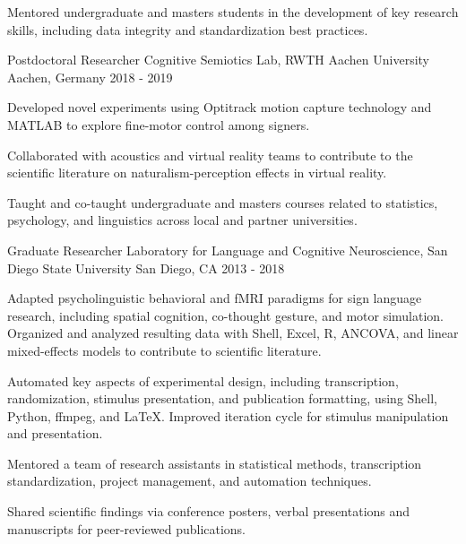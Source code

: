 \begin{cventries}
{\begin{cvitems}
        \item {Mentored undergraduate and masters students in the development of key research skills, including data integrity and standardization best practices.}
      \end{cvitems}
    }
\vspace{\baselineskip}  
  \cventry
    {Postdoctoral Researcher}
    {Cognitive Semiotics Lab, RWTH Aachen University}
    {Aachen, Germany}
    {2018 - 2019}
    {
      \begin{cvitems}
        \item {Developed novel experiments using Optitrack motion capture technology and MATLAB to explore fine-motor control among signers.}
        \item {Collaborated with acoustics and virtual reality teams to contribute to the scientific literature on naturalism-perception effects in virtual reality.}
        \item {Taught and co-taught undergraduate and masters courses related to statistics, psychology, and linguistics across local and partner universities.}
      \end{cvitems}
    }
\vspace{\baselineskip}  
  \cventry
    {Graduate Researcher}
    {Laboratory for Language and Cognitive Neuroscience, San Diego State University}
    {San Diego, CA}
    {2013 - 2018}
    {
      \begin{cvitems}
        \item {Adapted psycholinguistic behavioral and fMRI paradigms for sign language research, including spatial cognition, co-thought gesture, and motor simulation. Organized and analyzed resulting data with Shell, Excel, R, ANCOVA, and linear mixed-effects models to contribute to scientific literature.}
        \item {Automated key aspects of experimental design, including transcription, randomization, stimulus presentation, and publication formatting, using Shell, Python, ffmpeg, and \LaTeX. Improved iteration cycle for stimulus manipulation and presentation.}
        \item {Mentored a team of research assistants in statistical methods, transcription standardization, project management, and automation techniques.}
        \item {Shared scientific findings via conference posters, verbal presentations and manuscripts for peer-reviewed publications.}

\end{cvitems}}
\end{cventries}

